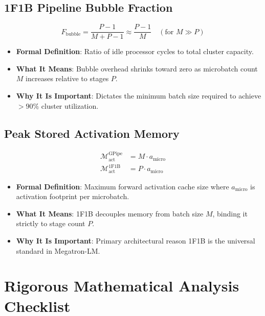 \documentclass[11pt,a4paper]{article}
\theoremstyle{definition}
\begin{document}
\subsection{1F1B Pipeline Bubble Fraction}
{\boldmath
\begin{equation}
F_{\text{bubble}} = \frac{P - 1}{M + P - 1} \approx \frac{P - 1}{M} \quad (\text{for } M \gg P)
\end{equation}
}
\begin{itemize}
    \item \textbf{Formal Definition}: Ratio of idle processor cycles to total cluster capacity.
    \item \textbf{What It Means}: Bubble overhead shrinks toward zero as microbatch count $M$ increases relative to stages $P$.
    \item \textbf{Why It Is Important}: Dictates the minimum batch size required to achieve $>90\%$ cluster utilization.
\end{itemize}

\subsection{Peak Stored Activation Memory}
{\boldmath
\begin{align}
\mathcal{M}_{\text{act}}^{\text{GPipe}} &= M \cdot a_{\text{micro}} \\
\mathcal{M}_{\text{act}}^{\text{1F1B}} &= P \cdot a_{\text{micro}}
\end{align}
}
\begin{itemize}
    \item \textbf{Formal Definition}: Maximum forward activation cache size where $a_{\text{micro}}$ is activation footprint per microbatch.
    \item \textbf{What It Means}: 1F1B decouples memory from batch size $M$, binding it strictly to stage count $P$.
    \item \textbf{Why It Is Important}: Primary architectural reason 1F1B is the universal standard in Megatron-LM.
\end{itemize}

\section{Rigorous Mathematical Analysis Checklist}
\end{document}
